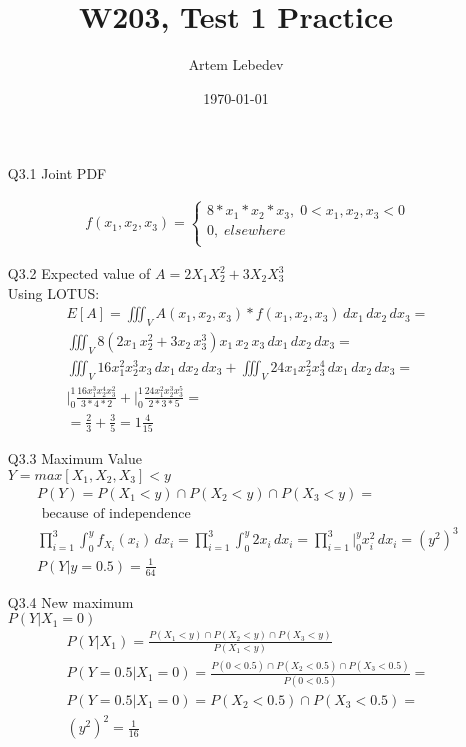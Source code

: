 \documentclass{article}
\author{Artem Lebedev}
\title{W203, Test 1 Practice}
\date{\today}
\begin{document}
\maketitle

\begin{enumerate}
\item[Q3.1] Joint PDF

	\begin{align*}
	 f(x_1,x_2,x_3) =
		\begin{cases}
		8*x_1*x_2*x_3,\;0<x_1,x_2,x_3<0\\
		0,\; elsewhere\\
		\end{cases}  
	\end{align*}

\item[Q3.2]Expected value of $A = 2X_1X^2_2+3X_2X^3_3$\\
	Using LOTUS:
	\begin{align*}
	E[A]=\iiint_V A(x_1,x_2,x_3)*f(x_1, x_2, x_3) \,dx_1\,dx_2\,dx_3=\\
	\iiint_V 8(2x_1\,x^2_2+3x_2\,x^3_3)x_1\,x_2\,x_3\,dx_1\,dx_2\,dx_3=\\
	\iiint_V 16x^2_1x^3_2x_3\,dx_1\,dx_2\,dx_3 + \iiint_V 24x_1x^2_2x^4_3\,dx_1\,dx_2\,dx_3=\\
	\Big|_0^1\frac{16x^3_1x^4_2x^2_3}{3*4*2}+\Big|_0^1\frac{24x^2_1x^3_2x^5_3}{2*3*5} = \\	
	= \frac{2}{3}+\frac{3}{5}=1\frac{4}{15}
	\end{align*}
\item[Q3.3]Maximum Value\\
$Y = max[X_1,X_2,X_3]<y$\\
	\begin{align*}
		P(Y) = P(X_1<y) \cap P(X_2<y) \cap P(X_3<y) =\\ \text{ because of independence} \\ \prod_{i=1}^{3} \int_0^y f_{X_i}(x_i)\,dx_i 
		= \prod_{i=1}^{3}\int_0^y 2x_i\,dx_i = \prod_{i=1}^{3}\Big|_0^y x_i^2\,dx_i = (y^2)^3\\
		P(Y|y = 0.5) = \frac{1}{64}
	\end{align*}
\item[Q3.4]New maximum\\
$P(Y|X_1 = 0)$\\
\begin{align*}
	P(Y|X_1) = \frac{P(X_1<y) \cap P(X_2<y) \cap P(X_3<y)}{P(X_1<y)}\\
	P(Y=0.5|X_1=0) = \frac{P(0<0.5) \cap P(X_2<0.5) \cap P(X_3<0.5)}{P(0<0.5)} = \\
		P(Y=0.5|X_1=0) = P(X_2<0.5) \cap P(X_3<0.5)=\\
		(y^2)^2 = \frac{1}{16}
\end{align*}
\end{enumerate}
\end{document}
